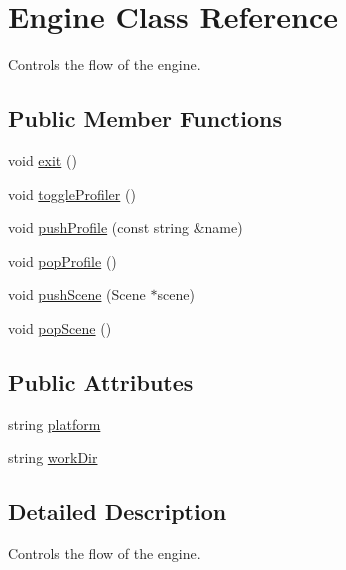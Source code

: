\hypertarget{class_engine}{\section{Engine Class Reference}
\label{class_engine}
}


Controls the flow of the engine.  


\subsection*{Public Member Functions}
\begin{DoxyCompactItemize}
\item 
void \hyperlink{class_engine_a358d2e2397ca11ccd17553e3c40e7901}{exit} ()
\item 
void \hyperlink{class_engine_af5ad29d634a54301cc7ce63490450dbb}{toggle\+Profiler} ()
\item 
void \hyperlink{class_engine_a2a3ce17d6a14d2d724df172b8aca1cc1}{push\+Profile} (const string \&name)
\item 
void \hyperlink{class_engine_abdc67701098d05bba11e9bc5424b69b0}{pop\+Profile} ()
\item 
void \hyperlink{class_engine_aee05edca6334bc473a1ba1319152e39d}{push\+Scene} (Scene $\ast$scene)
\item 
void \hyperlink{class_engine_a986825afe276e17d22b817f535a80423}{pop\+Scene} ()
\end{DoxyCompactItemize}
\subsection*{Public Attributes}
\begin{DoxyCompactItemize}
\item 
string \hyperlink{class_engine_ab33ce334382344871104873746995d5d}{platform}
\item 
string \hyperlink{class_engine_a3fe0ea911c35ded34831c9c13e8c3d53}{work\+Dir}
\end{DoxyCompactItemize}


\subsection{Detailed Description}
Controls the flow of the engine. 

